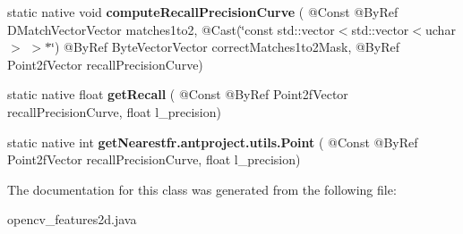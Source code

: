 \begin{DoxyCompactItemize}
\item 
static native void {\bfseries compute\+Recall\+Precision\+Curve} ( @Const @By\+Ref D\+Match\+Vector\+Vector matches1to2, @Cast(\char`\"{}const std\+::vector$<$std\+::vector$<$uchar$>$ $>$$\ast$\char`\"{}) @By\+Ref Byte\+Vector\+Vector correct\+Matches1to2\+Mask, @By\+Ref Point2f\+Vector recall\+Precision\+Curve)
\item 
static native float {\bfseries get\+Recall} ( @Const @By\+Ref Point2f\+Vector recall\+Precision\+Curve, float l\+\_\+precision)
\item 
static native int {\bfseries get\+Nearest\+fr.antproject.utils.Point} ( @Const @By\+Ref Point2f\+Vector recall\+Precision\+Curve, float l\+\_\+precision)
\end{DoxyCompactItemize}


The documentation for this class was generated from the following file\+:\begin{DoxyCompactItemize}
\item 
opencv\+\_\+features2d.\+java\end{DoxyCompactItemize}
